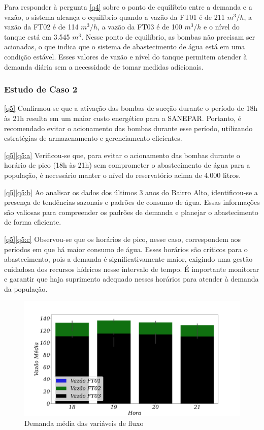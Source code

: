 Para responder à pergunta \ref{q4} sobre o ponto de equilíbrio entre a demanda e a vazão, o sistema alcança o equilíbrio quando a vazão da FT01 é de 211 $m^3/h$, a vazão da FT02 é de 114 $m^3/h$, a vazão da FT03 é de 100 $m^3/h$ e o nível do tanque está em 3.545 $m^3$. Nesse ponto de equilíbrio, as bombas não precisam ser acionadas, o que indica que o sistema de abastecimento de água está em uma condição estável. Esses valores de vazão e nível do tanque permitem atender à demanda diária sem a necessidade de tomar medidas adicionais.


\subsubsection{Estudo de Caso 2}

\eqref{q5} Confirmou-se que a ativação das bombas de sucção durante o período de 18h às 21h resulta em um maior custo energético para a SANEPAR. Portanto, é recomendado evitar o acionamento das bombas durante esse período, utilizando estratégias de armazenamento e gerenciamento eficientes.

\eqref{q5}\ref{q5:a} Verificou-se que, para evitar o acionamento das bombas durante o horário de pico (18h às 21h) sem comprometer o abastecimento de água para a população, é necessário manter o nível do reservatório acima de $4.000$ litros.

\eqref{q5}\ref{q5:b} Ao analisar os dados dos últimos 3 anos do Bairro Alto, identificou-se a presença de tendências sazonais e padrões de consumo de água. Essas informações são valiosas para compreender os padrões de demanda e planejar o abastecimento de forma eficiente.

\eqref{q5}\ref{q5:c} Observou-se que os horários de pico, nesse caso, correspondem aos períodos em que há maior consumo de água. Esses horários são críticos para o abastecimento, pois a demanda é significativamente maior, exigindo uma gestão cuidadosa dos recursos hídricos nesse intervalo de tempo. É importante monitorar e garantir que haja suprimento adequado nesses horários para atender à demanda da população.



\begin{figure}[H]
	\centering
	\caption{Demanda média das variáveis de fluxo}
	\includegraphics[width=0.9\linewidth]{Resultados/Figuras/grafico-barras-demanda}
	
	\label{fig:grafico-barras-demanda}
	

\end{figure}

